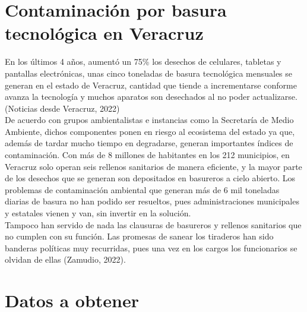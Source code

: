 \documentclass[letterpaper,12pt]{article}
\begin{document}
\begin{sloppypar}
\section{Contaminación por basura tecnológica en Veracruz}
En los últimos 4 años, aumentó un 75\% los desechos de celulares, tabletas y pantallas electrónicas, unas cinco toneladas de basura tecnológica mensuales se generan en el
estado de Veracruz, cantidad que tiende a incrementarse conforme avanza la tecnología y muchos aparatos son desechados al no poder actualizarse. (Noticias desde Veracruz,
2022)
\vspace{0.3cm}\\ 
De acuerdo con grupos ambientalistas e instancias como la Secretaría de Medio Ambiente, dichos componentes ponen en riesgo al ecosistema del estado ya que, además de tardar mucho tiempo en degradarse, generan importantes índices de contaminación. Con más de 8 millones de habitantes en los 212 municipios, en Veracruz solo operan seis rellenos sanitarios de manera eficiente, y la mayor parte de los desechos que se generan son depositados en basureros a cielo abierto. Los problemas de contaminación ambiental que generan más de 6 mil toneladas diarias de basura no han podido ser resueltos, pues administraciones municipales y estatales vienen y van, sin invertir en la solución.
\vspace{0.3cm}\\ 
Tampoco han servido de nada las clausuras de basureros y rellenos sanitarios que no cumplen con su función. Las promesas de sanear los tiraderos han sido banderas políticas
muy recurridas, pues una vez en los cargos los funcionarios se olvidan de ellas (Zamudio, 2022).
\newpage
\section{Datos a obtener}


\end{sloppypar}
\end{document}
